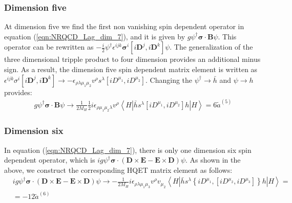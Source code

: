 \subsubsection{Dimension five}
\vspace{-0.2cm}
At dimension five we find the first non vanishing spin dependent operator in equation (\ref{eqn:NRQCD_Lag_dim_7}), and it is given by $g \psi^{\dagger} \bm{\sigma} \cdot \bm{B} \psi$. This operator can be rewritten as $-\frac{i}{2} \psi^{\dagger} \epsilon^{i j k} \bm{\sigma}^{i}\left[i \bm{D}^{j}, i \bm{D}^{k}\right] \psi$. The generalization of the three dimensional tripple product to four dimension provides an additional minus sign. As a result, the dimension five spin dependent matrix element is written as $\epsilon^{i j k} \sigma^{i}\left[i \bm{D}^{j}, i \bm{D}^{k}\right] \rightarrow-\epsilon_{\rho \lambda \mu_{1} \mu_{2}} v^{\rho} s^{\lambda}\left[i D^{\mu_{1}}, i D^{\mu_{2}}\right]$. Changing the $\psi^{\dagger}\to \bar{h}$ and $\psi\to h$ provides:
\begin{eqnarray}
g \psi^{\dagger} \bm{\sigma} \cdot \bm{B} \psi \rightarrow \frac{1}{2 M_{H}} \frac{1}{2} i \epsilon_{\rho \mu_{1} \mu_{2} \lambda} v^{\rho}\left\langle H\left|\bar{h} s^{\lambda}\left[i D^{\mu_{1}}, i D^{\mu_{2}}\right] h\right| H\right\rangle= 6 \tilde{a}^{(5)}
\end{eqnarray}
\subsubsection{Dimension six}
\vspace{-0.2cm}
In equation (\ref{eqn:NRQCD_Lag_dim_7}), there is only one dimension six spin dependent operator, which is $i g \psi^{\dagger} \bm{\sigma} \cdot(\bm{D} \times \bm{E}-\bm{E} \times \bm{D}) \psi$. As shown in the above, we construct the corresponding HQET matrix element as follows:
\begin{align}
&i g \psi^{\dagger} \bm{\sigma} \cdot(\bm{D} \times \bm{E}-\bm{E} \times \bm{D}) \psi \rightarrow-\frac{1}{2 M_{H}} i \epsilon_{\rho \lambda \mu_{1} \mu_{3}} v^{\rho} v_{\mu_{2}}\left\langle H\left|\bar{h} s^{\lambda}\left\{i D^{\mu_{1}},\left[i D^{\mu_{2}}, i D^{\mu_{3}}\right]\right\} h\right| H\right\rangle=\nonumber\\
&=-12 \tilde{a}^{(6)}
\end{align}
